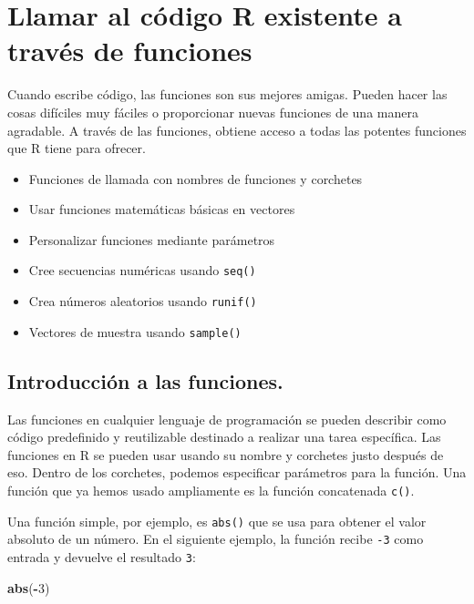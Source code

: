 \documentclass[
]{book}
\newenvironment{Shaded}{\begin{snugshade}}{\end{snugshade}}
\newcommand{\DecValTok}[1]{\textcolor[rgb]{0.00,0.00,0.81}{#1}}
\newcommand{\KeywordTok}[1]{\textcolor[rgb]{0.13,0.29,0.53}{\textbf{#1}}}
\newcommand{\NormalTok}[1]{#1}
\newcommand{\OperatorTok}[1]{\textcolor[rgb]{0.81,0.36,0.00}{\textbf{#1}}}
\providecommand{\tightlist}{%
  \setlength{\itemsep}{0pt}\setlength{\parskip}{0pt}}
\begin{document}
\hypertarget{llamar-al-cuxf3digo-r-existente-a-travuxe9s-de-funciones}{%
\section{Llamar al código R existente a través de funciones}\label{llamar-al-cuxf3digo-r-existente-a-travuxe9s-de-funciones}}

Cuando escribe código, las funciones son sus mejores amigas. Pueden hacer las cosas difíciles muy fáciles o proporcionar nuevas funciones de una manera agradable. A través de las funciones, obtiene acceso a todas las potentes funciones que R tiene para ofrecer.

\begin{itemize}
\tightlist
\item
  Funciones de llamada con nombres de funciones y corchetes
\item
  Usar funciones matemáticas básicas en vectores
\item
  Personalizar funciones mediante parámetros
\item
  Cree secuencias numéricas usando \texttt{seq()}
\item
  Crea números aleatorios usando \texttt{runif()}
\item
  Vectores de muestra usando \texttt{sample()}
\end{itemize}

\hypertarget{introducciuxf3n-a-las-funciones.}{%
\subsection{Introducción a las funciones.}\label{introducciuxf3n-a-las-funciones.}}

Las funciones en cualquier lenguaje de programación se pueden describir como código predefinido y reutilizable destinado a realizar una tarea específica. Las funciones en R se pueden usar usando su nombre y corchetes justo después de eso. Dentro de los corchetes, podemos especificar parámetros para la función. Una función que ya hemos usado ampliamente es la función concatenada \texttt{c()}.

Una función simple, por ejemplo, es \texttt{abs()} que se usa para obtener el valor absoluto de un número. En el siguiente ejemplo, la función recibe \texttt{-3} como entrada y devuelve el resultado \texttt{3}:

\begin{Shaded}
\begin{Highlighting}[]
\KeywordTok{abs}\NormalTok{(}\OperatorTok{-}\DecValTok{3}\NormalTok{)}
\end{Highlighting}
\end{Shaded}
\end{document}
